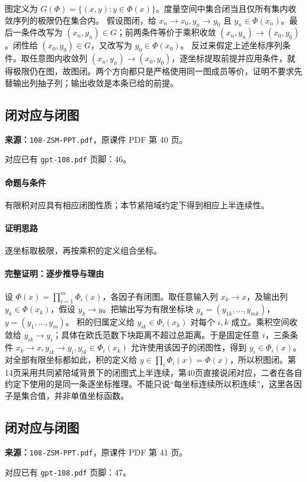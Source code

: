 图定义为 $G(\Phi)=\{(x,y):y\in\Phi(x)\}$。度量空间中集合闭当且仅所有集内收敛序列的极限仍在集合内。
假设图闭，给 $x_n\to x_0,y_n\to y_0$ 且 $y_n\in\Phi(x_n)$。最后一条件改写为 $(x_n,y_n)\in G$；前两条件等价于乘积收敛 $(x_n,y_n)\to(x_0,y_0)$。闭性给 $(x_0,y_0)\in G$，又改写为 $y_0\in\Phi(x_0)$。
反过来假定上述坐标序列条件。取任意图内收敛列 $(x_n,y_n)\to(x_0,y_0)$，逐坐标提取前提并应用条件，就得极限仍在图，故图闭。两个方向都只是严格使用同一图成员等价，证明不要求先替输出列抽子列；输出收敛是本条已给的前提。

\clearpage\subsection{闭对应与闭图}
\textbf{来源：}\texttt{108-ZSM-PPT.pdf}，原课件 PDF 第 40 页。\par
对应已有 \texttt{gpt-108.pdf} 页脚：46。\par
\paragraph{命题与条件}有限积对应具有相应闭图性质；本节紧陪域约定下得到相应上半连续性。
\paragraph{证明思路}逐坐标取极限，再按乘积的定义组合坐标。
\paragraph{完整证明：逐步推导与理由}

设 $\Phi(x)=\prod_{i=1}^m\Phi_i(x)$，各因子有闭图。取任意输入列 $x_k\to x$，及输出列 $y_k\in\Phi(x_k)$，假设 $y_k\to y$。把输出写为有限坐标块 $y_k=(y_{1k},\ldots,y_{mk})$，$y=(y_1,\ldots,y_m)$。
积的归属定义给 $y_{ik}\in\Phi_i(x_k)$ 对每个 $i,k$ 成立。乘积空间收敛给 $y_{ik}\to y_i$；具体在欧氏范数下块距离不超过总距离。于是固定任意 $i$，三条条件 $x_k\to x,y_{ik}\to y_i,y_{ik}\in\Phi_i(x_k)$ 允许使用该因子的闭图性，得到 $y_i\in\Phi_i(x)$。
对全部有限坐标都如此，积的定义给 $y\in\prod_i\Phi_i(x)=\Phi(x)$，所以积图闭。第14页采用共同紧陪域背景下的闭图式上半连续，第40页直接说闭对应，二者在各自约定下使用的是同一条逐坐标推理。不能只说“每坐标连续所以积连续”，这里各因子是集合值，并非单值坐标函数。

\clearpage\subsection{闭对应与闭图}
\textbf{来源：}\texttt{108-ZSM-PPT.pdf}，原课件 PDF 第 41 页。\par
对应已有 \texttt{gpt-108.pdf} 页脚：47。\par
